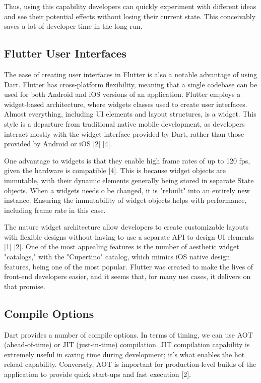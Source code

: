 Thus, using this capability developers can quickly experiment with different ideas and see their potential effects without losing their current state. This conceivably 
saves a lot of developer time in the long run. 

\subsection{Flutter User Interfaces}

The ease of creating user interfaces in Flutter is also a notable advantage of using Dart. Flutter has cross-platform flexibility, meaning that a single
codebase can be used for both Android and iOS versions of an application. Flutter employs a widget-based architecture, where widgets classes
used to create user interfaces. Almost everything, including UI elements and layout structures, is a widget. This style is a departure from traditional native
mobile development, as developers interact mostly with the widget interface provided by Dart, rather than those provided by Android or iOS [2] [4].

One advantage to widgets is that they enable high frame rates of up to 120 fps, given the hardware is compatible [4]. This is because widget objects are immutable, with 
their dynamic elements generally being stored in separate State objects. When a widgets needs o be changed, it is "rebuilt" into an entirely new instance. Ensuring
the immutability of widget objects helps with performance, including frame rate in this case. 

The nature widget architecture allow developers to create customizable layouts with flexible designs without having to use a separate API to design UI elements [1] [2]. 
One of the most appealing features is the number of aesthetic 
widget "catalogs," with the "Cupertino" catalog, which mimics iOS native design features, being one of the most popular. Flutter was created to make the lives
of front-end developers easier, and it seems that, for many use cases, it delivers on that promise. 

\subsection{Compile Options}

Dart provides a number of compile options. In terms of timing, we can use AOT (ahead-of-time) or JIT (just-in-time) compilation. JIT
compilation capability is extremely useful in saving time during development; it's what enables the hot reload capability. Conversely,
AOT is important for production-level builds of the application to provide quick start-ups and fast execution [2].

